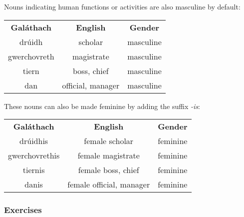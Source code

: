 Nouns indicating human functions or activities are also masculine by default:
\begin{table}[H]
\centering
\begin{tabular}{ccc}
  \toprule
  \textbf{Gal\'{a}thach} & \textbf{English} & \textbf{Gender}\\
  \cmidrule(lr){1-1}\cmidrule(lr){2-2}\cmidrule(lr){3-3}
  dr\'{u}idh & scholar & masculine\\
  gwerchovreth & magistrate & masculine\\
  tiern & boss, chief & masculine\\
  dan & official, manager & masculine\\
  \bottomrule
\end{tabular}
\label{example_gender_human_functions}
\end{table}

These nouns can also be made feminine by adding the suffix \textit{-is}:
\begin{table}[H]
\centering
\begin{tabular}{ccc}
  \toprule
  \textbf{Gal\'{a}thach} & \textbf{English} & \textbf{Gender}\\
  \cmidrule(lr){1-1}\cmidrule(lr){2-2}\cmidrule(lr){3-3}
  dr\'{u}idhis & female scholar & feminine\\
  gwerchovrethis & female magistrate & feminine\\
  tiernis & female boss, chief & feminine\\
  danis & female official, manager & feminine\\
  \bottomrule
\end{tabular}
\label{example_gender_human_functions_femalize}
\end{table}

\newpage
\subsubsection{Exercises}

